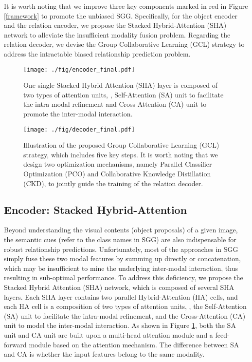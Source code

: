\documentclass[10pt,twocolumn,letterpaper]{article}
\begin{document}
It is worth noting that we improve three key components marked in red in Figure \ref{framework} to promote the unbiased SGG. Specifically, for the object encoder and the relation encoder, we propose the Stacked Hybrid-Attention (SHA) network to alleviate the insufficient modality fusion problem. Regarding the relation decoder, we devise the Group Collaborative Learning (GCL) strategy to address the intractable biased relationship prediction problem.

\begin{figure}[t]
	\centering
	\texttt{[image: ./fig/encoder\_final.pdf]}
	\vspace{-0.4cm}
	\caption{One single Stacked Hybrid-Attention (SHA) layer is composed of two types of attention units, \ie, Self-Attention (SA) unit to facilitate the intra-modal refinement and Cross-Attention (CA) unit to promote the inter-modal interaction.}
	\vspace{-0.4cm}
	\label{encoder}
\end{figure}

\begin{figure*}[t]
	\begin{center}
		\texttt{[image: ./fig/decoder\_final.pdf]}
	\end{center}
	\vspace{-0.4cm}
	\caption{Illustration of the proposed Group Collaborative Learning (GCL) strategy, which includes five key steps. It is worth noting that we design two optimization mechanisms, namely Parallel Classifier Optimization (PCO) and Collaborative Knowledge Distillation (CKD), to jointly guide the training of the relation decoder.}
	\vspace{-0.4cm}
	\label{decoder}
\end{figure*}

\subsection{Encoder: Stacked Hybrid-Attention}
\label{Sec33}
Beyond understanding the visual contents (object proposals) of a given image, the semantic cues (refer to the class names in SGG) are also indispensable for robust relationship predictions. Unfortunately, most of the approaches in SGG simply fuse these two modal features by summing up directly or concatenation, which may be insufficient to mine the underlying inter-modal interaction, thus resulting in sub-optimal performance. To address this deficiency, we propose the Stacked Hybrid Attention (SHA) network, which is composed of several SHA layers. Each SHA layer contains two parallel Hybrid-Attention (HA) cells, and each HA cell is a composition of two types of attention units, \ie, the Self-Attention (SA) unit to facilitate the intra-modal refinement, and the Cross-Attention (CA) unit to model the inter-modal interaction. As shown in Figure \ref{encoder}, both the SA unit and CA unit are built upon a multi-head attention module and a feed-forward module based on the attention mechanism\cite{vaswani2017attention}. The difference between SA and CA is whether the input features belong to the same modality.
\end{document}
